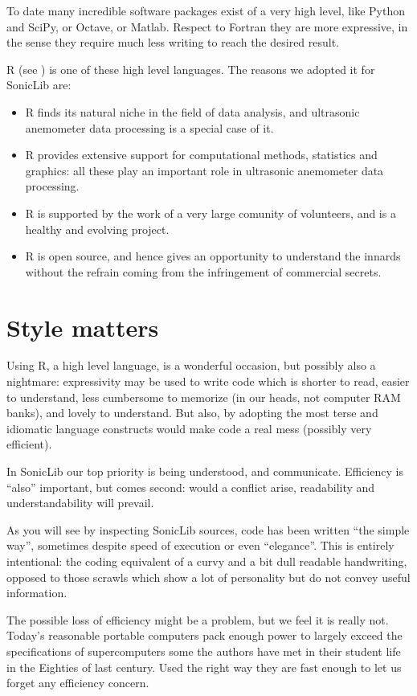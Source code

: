 \documentclass[a4paper,10pt]{book}
\begin{document}
To date many incredible software packages exist of a very high level, like Python and SciPy, or Octave, or Matlab. Respect to Fortran they are more expressive, in the sense they require much less writing to reach the desired result.

R (see \cite{RManual}) is one of these high level languages. The reasons we adopted it for SonicLib are:

\begin{itemize}
 \item R finds its natural niche in the field of data analysis, and ultrasonic anemometer data processing is a special case of it.
 \item R provides extensive support for computational methods, statistics and graphics: all these play an important role in ultrasonic anemometer data processing.
 \item R is supported by the work of a very large comunity of volunteers, and is a healthy and evolving project.
 \item R is open source, and hence gives an opportunity to understand the innards without the refrain coming from the infringement of commercial secrets.
\end{itemize}

\section{Style matters}

Using R, a high level language, is a wonderful occasion, but possibly also a nightmare: expressivity may be used to write code which is shorter to read, easier to understand, less cumbersome to memorize (in our heads, not computer RAM banks), and lovely to understand. But also, by adopting the most terse and idiomatic language constructs would make code a real mess (possibly very efficient).

In SonicLib our top priority is being understood, and communicate. Efficiency is ``also'' important, but comes second: would a conflict arise, readability and understandability will prevail.

As you will see by inspecting SonicLib sources, code has been written ``the simple way'', sometimes despite speed of execution or even ``elegance''. This is entirely intentional: the coding equivalent of a curvy and a bit dull readable handwriting, opposed to those scrawls which show a lot of personality but do not convey useful information.

The possible loss of efficiency might be a problem, but we feel it is really not. Today's reasonable portable computers pack enough power to largely exceed the specifications of supercomputers some the authors have met in their student life in the Eighties of last century. Used the right way they are fast enough to let us forget any efficiency concern.
\end{document}

